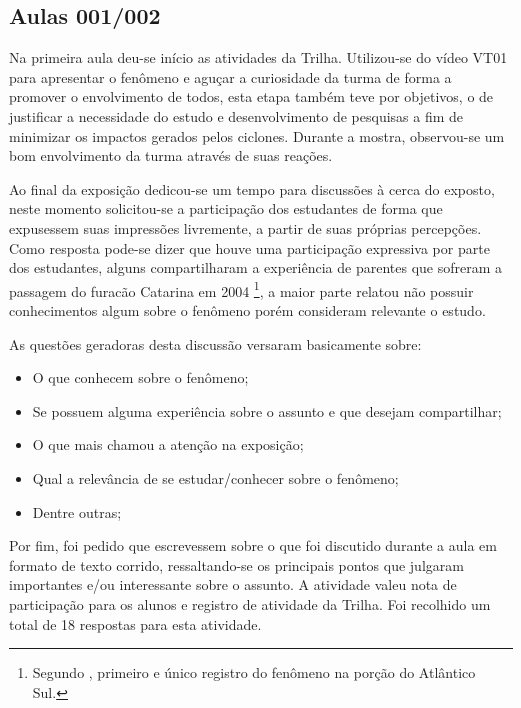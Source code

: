\subsection{Aulas 001/002} %
\label{sub:Aulas 001/002}
Na primeira aula deu-se início as atividades da Trilha. Utilizou-se do vídeo VT01 para apresentar o fenômeno e aguçar a curiosidade da turma de forma a promover o envolvimento de todos, esta etapa também teve por objetivos, o de justificar a necessidade do estudo e desenvolvimento de pesquisas a fim de minimizar os impactos gerados pelos ciclones. Durante a mostra, observou-se um bom envolvimento da turma através de suas reações.

Ao final da exposição dedicou-se um tempo para discussões à cerca do exposto, neste momento solicitou-se a participação dos estudantes de forma que expusessem suas impressões livremente, a partir de suas próprias percepções. Como resposta pode-se dizer que houve uma participação expressiva por parte dos estudantes, alguns compartilharam a experiência de parentes que sofreram a passagem do furacão Catarina em 2004 \footnote{Segundo \cite{PEZZA:2005}, primeiro e único registro do fenômeno na porção do Atlântico Sul.}, a maior parte relatou não possuir conhecimentos algum sobre o fenômeno porém consideram relevante o estudo.

As questões geradoras desta discussão versaram basicamente sobre:

\begin{itemize}
	\item O que conhecem sobre o fenômeno;
	\item Se possuem alguma experiência sobre o assunto e que desejam compartilhar;
	\item O que mais chamou a atenção na exposição;
	\item Qual a relevância de se estudar/conhecer sobre o fenômeno;
	\item Dentre outras;
\end{itemize}



Por fim, foi pedido que escrevessem sobre o que foi discutido durante a aula em formato de texto corrido, ressaltando-se os principais pontos que julgaram importantes e/ou interessante sobre o assunto. A atividade valeu nota de participação para os alunos e registro de atividade da Trilha. Foi recolhido um total de 18 respostas para esta atividade.

